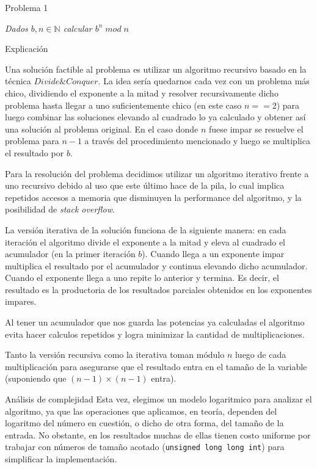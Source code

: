 \begin{section}{Problema 1}

	\textit{Dados $b,n \in \mathbb{N} $ calcular $b^n\; mod\; n$}

	\begin{subsection}{Explicación}

		Una solución factible al problema es utilizar un algoritmo recursivo basado en la técnica $Divide \& Conquer$.
		La idea sería quedarnos cada vez con un problema más chico, dividiendo el exponente a la mitad y resolver recursivamente dicho problema hasta llegar a uno suficientemente chico (en este caso $n==2$) para luego combinar las soluciones elevando al cuadrado lo ya calculado y obtener así una solución al problema original. En el caso donde $n$ fuese impar se resuelve el problema para $n-1$ a través del procedimiento mencionado y luego se multiplica el resultado por $b$.

		Para la resolución del problema decidimos utilizar un algoritmo iterativo frente a uno recursivo debido al uso que este último hace de la pila, lo cual implica repetidos accesos a memoria que disminuyen la performance del algoritmo, y la posibilidad de {\em stack overflow}.

		La versión iterativa de la solución funciona de la siguiente manera: en cada iteración el algoritmo divide el exponente a la mitad y eleva al cuadrado el acumulador (en la primer iteración $b$). Cuando llega a un exponente impar multiplica el resultado por el acumulador y continua elevando dicho acumulador. Cuando el exponente llega a uno repite lo anterior y termina. Es decir, el resultado es la productoria de los resultados parciales obtenidos en los exponentes impares.

		Al tener un acumulador que nos guarda las potencias ya calculadas el algoritmo evita hacer calculos repetidos y logra minimizar la cantidad de multiplicaciones.

		Tanto la versión recursiva como la iterativa toman módulo $n$ luego de cada multiplicación para asegurarse que el resultado entra en el tamaño de la variable (suponiendo que $(n-1)\times (n-1)$ entra).


		\begin{subsubsection}{Análisis de complejidad}
		Esta vez, elegimos un modelo logaritmico para analizar el algoritmo, ya que las operaciones que aplicamos, en teoría, dependen del logaritmo del número en cuestión, o dicho de otra forma, del tamaño de la entrada. No obstante, en los resultados muchas de ellas tienen costo uniforme por trabajar con números de tamaño acotado (\texttt{unsigned long long int}) para simplificar la implementación.\Pa


\end{subsubsection}
\end{subsection}
\end{section}
